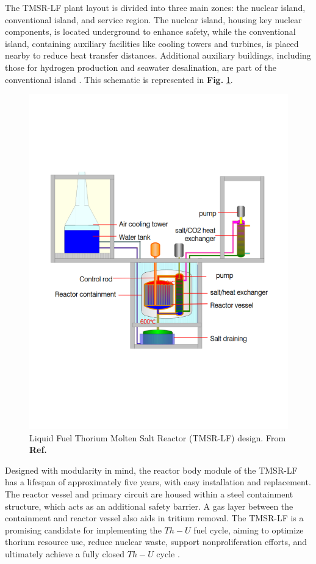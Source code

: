The TMSR-LF plant layout is divided into three main zones: the nuclear island, conventional island, and service region. The nuclear island, housing key nuclear components, is located underground to enhance safety, while the conventional island, containing auxiliary facilities like cooling towers and turbines, is placed nearby to reduce heat transfer distances. Additional auxiliary buildings, including those for hydrogen production and seawater desalination, are part of the conventional island \cite{TMSR_book}. This schematic is represented in \textbf{Fig.} \ref{fig:TMSR-LF}.

\begin{figure}[H]
    \centering
    \includegraphics[scale=0.5]{Kap6/Figures_Kap6/TMSR-LF_2.png}
    \caption{Liquid Fuel Thorium Molten Salt Reactor (TMSR-LF) design. From \textbf{Ref.} \cite{Xu2017}}
    \label{fig:TMSR-LF}    
\end{figure}

Designed with modularity in mind, the reactor body module of the TMSR-LF has a lifespan of approximately five years, with easy installation and replacement. The reactor vessel and primary circuit are housed within a steel containment structure, which acts as an additional safety barrier. A gas layer between the containment and reactor vessel also aids in tritium removal. The TMSR-LF is a promising candidate for implementing the \(Th-U\) fuel cycle, aiming to optimize thorium resource use, reduce nuclear waste, support nonproliferation efforts, and ultimately achieve a fully closed \(Th-U\) cycle \cite{TMSR_book}.

